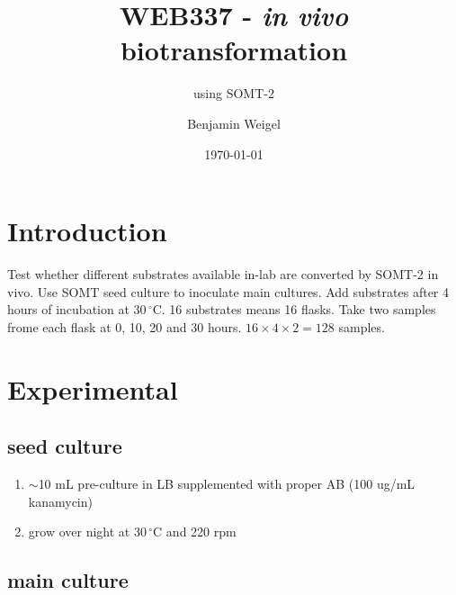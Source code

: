 \documentclass{scrartcl}\usepackage[]{graphicx}\usepackage[]{color}
\author{Benjamin Weigel}
\title{WEB337 - \textit{in vivo} biotransformation}
\subtitle{using SOMT-2}
\date{\today}
\newcommand{\degC}{\protect$\,^\circ$C\xspace}
\begin{document}
\sffamily
\maketitle

\tableofcontents
\listoffigures
\listoftables

\section{Introduction}

Test whether different substrates available in-lab are converted by SOMT-2 in vivo. Use SOMT seed culture to inoculate main cultures. Add substrates after 4 hours of incubation at 30\degC . 16 substrates means 16 flasks. Take two samples frome each flask at 0, 10, 20 and 30 hours. $16 \times 4 \times 2 = 128$ samples.

\section{Experimental}

\subsection{seed culture}
\begin{enumerate}[label=\arabic*)]
\item $\sim$10 mL pre-culture in LB supplemented with proper AB (100 ug/mL kanamycin)
\item grow over night at 30\degC and 220 rpm
\end{enumerate}

\subsection{main culture}
\end{document}
